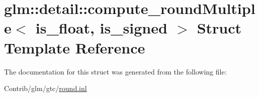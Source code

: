 \hypertarget{structglm_1_1detail_1_1compute__round_multiple}{}\section{glm\+:\+:detail\+:\+:compute\+\_\+round\+Multiple$<$ is\+\_\+float, is\+\_\+signed $>$ Struct Template Reference}
\label{structglm_1_1detail_1_1compute__round_multiple}


The documentation for this struct was generated from the following file\+:\begin{DoxyCompactItemize}
\item 
Contrib/glm/gtc/\mbox{\hyperlink{round_8inl}{round.\+inl}}\end{DoxyCompactItemize}
